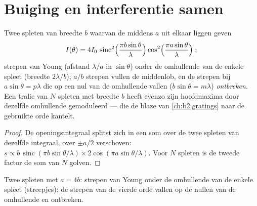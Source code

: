 \section{Buiging en interferentie samen}

\begin{proposition}\label{prop:b2:diffraction:combined}
Twee spleten van breedte $b$ waarvan de middens $a$ uit elkaar liggen geven
\[
I(\theta) = 4I_0\,\operatorname{sinc}^2\Bigl(\frac{\pi b\sin\theta}\lambda\Bigr)\cos^2\Bigl(\frac{\pi a\sin\theta}\lambda\Bigr) :
\]
strepen van Young (afstand $\lambda/a$ in $\sin\theta$) onder de omhullende van de
enkele spleet (breedte $2\lambda/b$); $a/b$ strepen vullen de middenlob, en de
strepen bij $a\sin\theta = p\lambda$ die op een nul van de omhullende vallen
($b\sin\theta = m\lambda$) \emph{ontbreken}. Een tralie van $N$ spleten met breedte
$b$ heeft evenzo zijn hoofdmaxima door dezelfde omhullende gemoduleerd ---
die de blaze van \cref{ch:b2:gratings} naar de gebruikte orde kantelt.
\end{proposition}

\begin{proof}
De openingsintegraal splitst zich in een som over de twee spleten van dezelfde
integraal, over $\pm a/2$ verschoven:
$\underline s \propto b\,\operatorname{sinc}(\pi b\sin\theta/\lambda)
\times2\cos(\pi a\sin\theta/\lambda)$.
Voor $N$ spleten is de tweede factor de
som van $N$ golven.
\end{proof}

\begin{omfigure}

{\small Twee spleten met $a = 4b$: strepen van Young onder de omhullende
van de enkele spleet (streepjes); de strepen van de vierde orde vallen op de
nullen van de omhullende en ontbreken.}
\end{omfigure}

